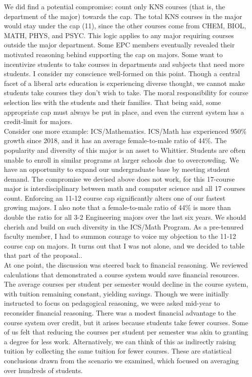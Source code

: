 \documentclass[../../../main.tex]{subfiles}
\begin{document}
We did find a potential compromise: count only KNS courses (that is, the department of the major) towards the cap.  The total KNS courses in the major would stay under the cap (11), since the other courses come from CHEM, BIOL, MATH, PHYS, and PSYC.  This logic applies to any major requiring courses outside the major department.  Some EPC members eventually revealed their motivated reasoning behind supporting the cap on majors.  Some want to incentivize students to take courses in departments and subjects that need more students.  I consider my conscience well-formed on this point.  Though a central facet of a liberal arts education is experiencing diverse thought, we cannot make students take courses they don't wish to take.  The moral responsibility for course selection lies with the students and their families.  That being said, some appropriate cap must always be put in place, and even the current system has a credit-limit for majors.
\\
\vspace{0.15cm}
Consider one more example: ICS/Mathematics.  ICS/Math has experienced 950\% growth since 2018, and it has an average female-to-male ratio of 44\%.  The popularity and diversity of this major is an asset to Whittier.  Students are often unable to enroll in similar programs at larger schools due to overcrowding.  We have an opportunity to expand our undergraduate base by meeting student demand.  The compromise we devised above does not work, for this 17-course major is interdisciplinary between math and computer science and all 17 courses count.  Enforcing an 11-12 course cap significantly alters one of our fastest growing majors.  I also note that a female-to-male ratio of 44\% is more than double the ratio for all 3-2 Engineering majors over the last six years.  We should cherish and build on such diversity in the ICS/Math Program.  As a pre-tenured faculty member, I had to summon courage to voice my objection to the 11-12 course cap on majors.  It turns out that I was not alone, and we decided to table that part of the proposal..
\\
\vspace{0.15cm}
At one point, the discussion was steered back to financial reasoning.  We reviewed calculations that demonstrated a course system would save financial resources.  The average courses per student per semester would decline in the course system, with tuition remaining constant, yielding savings.  Though we were initially instructed to focus on pedagogical reasoning, we were asked mid-year to reconsider financial reasoning.  There was a modest financial advantage to the course system over credit, but it arises because students take fewer courses.  Some of us felt that reducing the courses per student per semester was akin to granting a degree for less work.  Alternatively, we can think of this as indirectly raising tuition by collecting the same tuition for fewer courses.  These are statistical conclusions drawn from the scenario we examined, which focused on averaging over hundreds of students.
\end{document}
